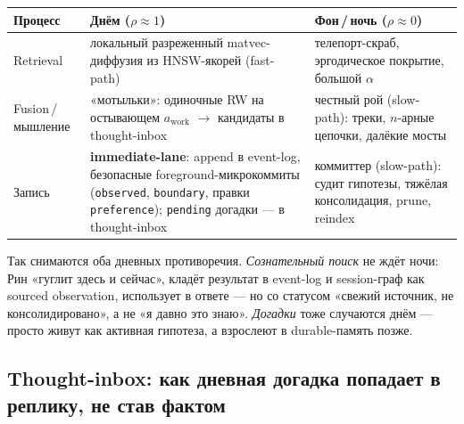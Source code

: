 \begin{center}
\begin{tabular}{p{} p{} p{}}
\toprule
\textbf{Процесс} & \textbf{Днём ($\rho\!\approx\!1$)} & \textbf{Фон\,/\,ночь ($\rho\!\approx\!0$)} \\
\midrule
Retrieval & локальный разреженный matvec-диффузия из HNSW-якорей (fast-path) & телепорт-скраб, эргодическое покрытие, большой $\alpha$ \\
Fusion\,/\,мышление & «мотыльки»: одиночные RW на остывающем $a_{\text{work}}$ $\to$ кандидаты в thought-inbox & честный рой (slow-path): треки, $n$-арные цепочки, далёкие мосты \\
Запись & \textbf{immediate-lane}: append в event-log, безопасные foreground-микрокоммиты (\texttt{observed}, \texttt{boundary}, правки \texttt{preference}); \texttt{pending} догадки — в thought-inbox & коммиттер (slow-path): судит гипотезы, тяжёлая консолидация, prune, reindex \\
\bottomrule
\end{tabular}
\end{center}

Так снимаются оба дневных противоречия. \emph{Сознательный поиск} не ждёт ночи: Рин
«гуглит здесь и сейчас», кладёт результат в event-log и session-граф как sourced
observation, использует в ответе — но со статусом «свежий источник, не консолидировано»,
а не «я давно это знаю». \emph{Догадки} тоже случаются днём — просто живут как активная
гипотеза, а взрослеют в durable-память позже.

\subsection{Thought-inbox: как дневная догадка попадает в реплику, не став фактом}
\label{sec:thoughtinbox}

